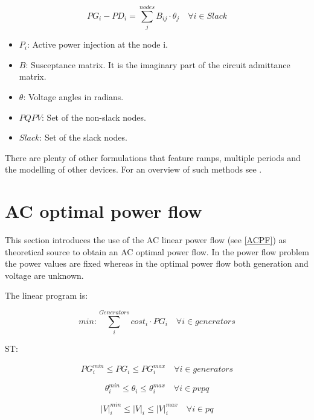 \documentclass[nols,a4paper,twoside,notoc,fleqn]{tufte-book}
\begin{document}
\begin{equation}
PG_i - PD_i=\sum_j^{nodes} B_{ij} \cdot \theta_j  \quad  \forall i \in Slack
\end{equation}

\begin{itemize}
	\item $P_i$: Active power injection at the node i.
	\item $B$: Susceptance matrix. It is the imaginary part of the circuit admittance matrix.
	\item $\theta$: Voltage angles in radians.
	\item $PQPV$: Set of the non-slack nodes.
	
	\item $Slack$: Set of the slack nodes.
\end{itemize}

There are plenty of other formulations that feature ramps, multiple periods and the modelling of other devices.
For an overview of such methods see \cite{taylor2015convex}.

\newpage
\section{AC optimal power flow}

This section introduces the use of the AC linear power flow (see \ref{ACPF}) as theoretical source to obtain an AC optimal power flow. In the power flow problem the power values are fixed whereas in the optimal power flow both generation and voltage are unknown.

The linear program is:

\begin{equation}
min: \sum_i^{Generators} cost_i \cdot PG_i   \quad \forall i \in generators
\end{equation}

ST:

\begin{equation}
PG_i^{min} \leq PG_i \leq PG_i^{max}  \quad \forall i \in generators
\end{equation}

\begin{equation}
\theta_i^{min} \leq \theta_i \leq \theta_i^{max}  \quad \forall i \in pvpq
\end{equation}

\begin{equation}
|V|_i^{min} \leq |V|_i \leq |V|_i^{max}  \quad \forall i \in pq
\end{equation}
\end{document}
